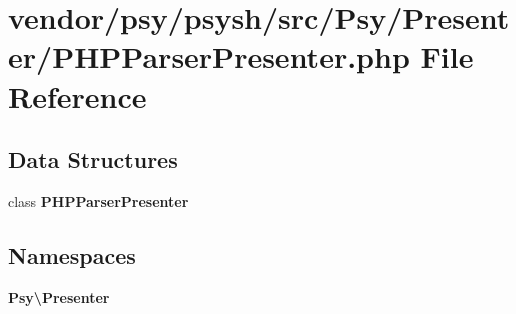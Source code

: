 \section{vendor/psy/psysh/src/\+Psy/\+Presenter/\+P\+H\+P\+Parser\+Presenter.php File Reference}
\label{_p_h_p_parser_presenter_8php}
\subsection*{Data Structures}
\begin{DoxyCompactItemize}
\item 
class {\bf P\+H\+P\+Parser\+Presenter}
\end{DoxyCompactItemize}
\subsection*{Namespaces}
\begin{DoxyCompactItemize}
\item 
 {\bf Psy\textbackslash{}\+Presenter}
\end{DoxyCompactItemize}
